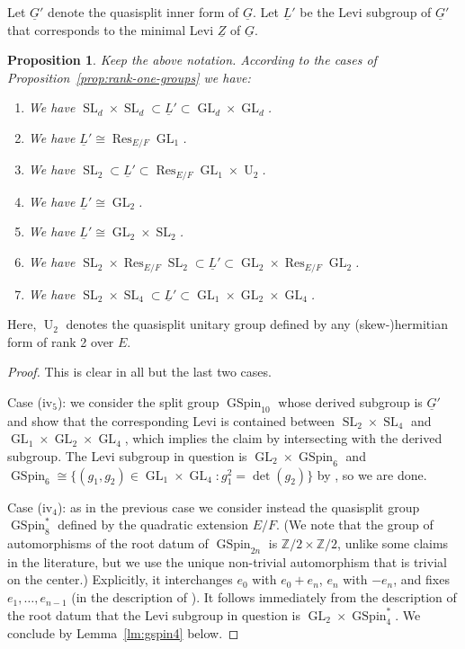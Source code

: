 \documentclass[a4paper]{amsart}
\numberwithin{equation}{section}
\newtheorem{prop}[thm]{Proposition}
\theoremstyle{remark}
\theoremstyle{definition}
\DeclareMathOperator{\Res}{Res}
\newcommand{\Z}{\mathbb{Z}}
\DeclareMathOperator{\SL}{SL}
\DeclareMathOperator{\U}{U}
\DeclareMathOperator{\GSpin}{GSpin}
\DeclareMathOperator{\GL}{GL}
\newcommand{\alggrp}[1]{\underline{#1}}
\begin{document}
Let $\alggrp{G}'$ denote the quasisplit inner form of $\alggrp{G}$. Let $\alggrp{L}'$ be the Levi subgroup of $\alggrp{G}'$ that corresponds to the
minimal Levi $\alggrp{Z}$ of $\alggrp{G}$.

\begin{prop}\label{prop:rank-one-levis}
  Keep the above notation. According to the cases of Proposition~\ref{prop:rank-one-groups} we have:
  \begin{enumerate}
  \item[(i)] We have $\SL_d \times \SL_d \subset \alggrp{L}' \subset \GL_d \times \GL_d$.
  \item[(ii$_3$)] We have $\alggrp{L}' \cong \Res_{E/F} \GL_1$.
  \item[(ii$_4$)] We have $\SL_2 \subset \alggrp{L}' \subset \Res_{E/F} \GL_1 \times \U_2$.
  \item[(iii$_1$)] We have $\alggrp{L}' \cong \GL_2$.
  \item[(iii$_2$)] We have $\alggrp{L}' \cong \GL_2 \times \SL_2$.
  \item[(iv$_4$)] We have $\SL_2 \times \Res_{E/F} \SL_2 \subset \alggrp{L}' \subset \GL_2 \times \Res_{E/F} \GL_2$.
  \item[(iv$_5$)] We have $\SL_2 \times \SL_4 \subset \alggrp{L}' \subset \GL_1 \times \GL_2 \times \GL_4$.
  \end{enumerate}
\end{prop}

Here, $\U_2$ denotes the quasisplit unitary group defined by any (skew-)hermitian form of rank 2 over $E$.

\begin{proof}
  This is clear in all but the last two cases. 

  Case (iv$_5$): we consider the split group $\GSpin_{10}$ whose derived subgroup is $\alggrp{G}'$ and show that the
  corresponding Levi is contained between $\SL_2 \times \SL_4$ and $\GL_1 \times \GL_2 \times \GL_4$, which implies
  the claim by intersecting with the derived subgroup.
  The Levi subgroup in question is $\GL_2 \times \GSpin_6$ \cite[Theorem 2.7]{MR1913914} and $\GSpin_6 \cong \{ (g_1,g_2) \in \GL_1 \times \GL_4 : g_1^2 = \det(g_2)\}$
  by \cite[Proposition 2.1]{MR3719299}, so we are done.

  Case (iv$_4$): as in the previous case we consider instead the quasisplit group $\GSpin^*_8$ defined by the quadratic extension $E/F$.
  (We note that the group of automorphisms of the root datum of $\GSpin_{2n}$ is $\Z/2 \times \Z/2$, unlike some claims in the literature,
  but we use the unique non-trivial automorphism that is trivial on the center.)
  Explicitly, it interchanges $e_0$ with $e_0+e_n$, $e_n$ with $-e_n$, and fixes $e_1,\dots,e_{n-1}$ (in the description of \cite[Proposition 2.4]{MR1913914}).
  It follows immediately from the description of the root datum that the Levi subgroup in question is $\GL_2 \times \GSpin^*_4$.
  We conclude by Lemma~\ref{lm:gspin4} below.
\end{proof}
\end{document}
